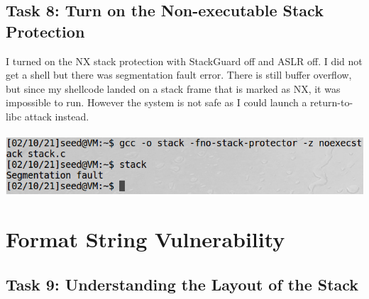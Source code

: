 \documentclass[a4paper]{article}
\begin{document}
\subsection{Task 8: Turn on the Non-executable Stack Protection}
I turned on the NX stack protection with StackGuard off and ASLR off. I did not get a shell but there was segmentation fault error. There is still buffer overflow, but since my shellcode landed on a stack frame that is marked as NX, it was impossible to run. However the system is not safe as I could launch a return-to-libc attack instead.\\\\
\includegraphics[scale=0.7]{2/16.png}\\
\pagebreak
\section{Format String Vulnerability}
\subsection{Task 9: Understanding the Layout of the Stack}
\end{document}
